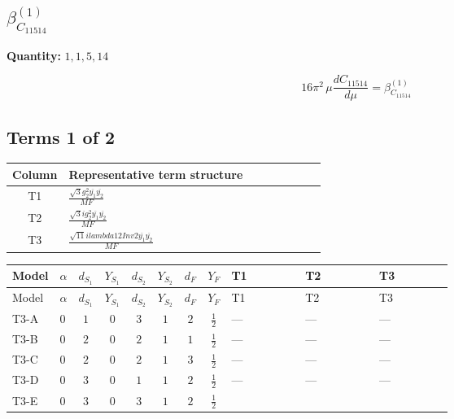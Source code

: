 \documentclass[8pt]{article}
\begin{document}
\begin{landscape}
\section*{$\beta_{C_{11514}}^{(1)}$}
\noindent\textbf{Quantity: }$\mathrm{1,1,5,14}$\par\smallskip
\[16\pi^2\,\mu\frac{d C_{11514}}{d\mu}=\beta_{C_{11514}}^{(1)}\]
\subsection*{Terms 1 of 2}
\begin{center}
\begin{tabular}{@{}c >{\raggedright\arraybackslash}p{0.82\linewidth}@{}}
\toprule
Column & Representative term structure \\
\midrule
T1 & \(\displaystyle \frac{\sqrt{3} g_{2}^{2} \overline{y_{1}} \overline{y_{2}}}{MF}\) \\
\midrule
T2 & \(\displaystyle \frac{\sqrt{3} i g_{2}^{2} \overline{y_{1}} \overline{y_{2}}}{MF}\) \\
\midrule
T3 & \(\displaystyle \frac{\sqrt{11} i lambda12Inv2 \overline{y_{1}} \overline{y_{2}}}{MF}\) \\
\midrule
\bottomrule
\end{tabular}
\end{center}
\smallskip
\tiny
\begin{longtable}{@{}llcccccc >{\raggedright\arraybackslash}p{0.21\linewidth} >{\raggedright\arraybackslash}p{0.21\linewidth} >{\raggedright\arraybackslash}p{0.21\linewidth}@{}}
\toprule
Model & $\alpha$ & $d_{S_1}$ & $Y_{S_1}$ & $d_{S_2}$ & $Y_{S_2}$ & $d_F$ & $Y_F$ & T1 & T2 & T3 \\
\midrule
\endfirsthead
\toprule
Model & $\alpha$ & $d_{S_1}$ & $Y_{S_1}$ & $d_{S_2}$ & $Y_{S_2}$ & $d_F$ & $Y_F$ & T1 & T2 & T3 \\
\midrule
\endhead
T3-A & $0$ & $1$ & $0$ & $3$ & $1$ & $2$ & $\frac{1}{2}$ & --- & --- & --- \\
\midrule
T3-B & $0$ & $2$ & $0$ & $2$ & $1$ & $1$ & $\frac{1}{2}$ & --- & --- & --- \\
\midrule
T3-C & $0$ & $2$ & $0$ & $2$ & $1$ & $3$ & $\frac{1}{2}$ & --- & --- & --- \\
\midrule
T3-D & $0$ & $3$ & $0$ & $1$ & $1$ & $2$ & $\frac{1}{2}$ & --- & --- & --- \\
\midrule
T3-E & $0$ & $3$ & $0$ & $3$ & $1$ & $2$ & $\frac{1}{2}$ & \scriptsize\adjustbox{max width=\linewidth}{$\begin{gathered} \frac{\sqrt{3} g_{2}^{2} \overline{y_{1}} \overline{y_{2}}}{6 MF}\end{gathered}$} & \scriptsize\adjustbox{max width=\linewidth}{$\begin{gathered} - \frac{11 \sqrt{3} i g_{2}^{2} \overline{y_{1}} \overline{y_{2}}}{8 MF}\end{gathered}$} & \scriptsize\adjustbox{max width=\linewidth}{$\begin{gathered} - \frac{3 \sqrt{11} i lambda12Inv2 \overline{y_{1}} \overline{y_{2}}}{22 MF}\end{gathered}$} \\

\end{longtable}
\end{landscape}
\end{document}
